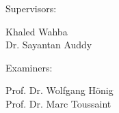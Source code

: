 \begin{center}
\begin{minipage}[b]{0.4\textwidth}
    Supervisors:               \\
    \begin{hsheadfont}
    Khaled Wahba \\
    Dr. Sayantan Auddy \\
    \end{hsheadfont}
\end{minipage}
\begin{minipage}[b]{0.35\textwidth}
  

    Examiners:              \\
    \begin{hsheadfont}
    Prof. Dr. Wolfgang Hönig \\ 
    Prof. Dr. Marc Toussaint \\
    \end{hsheadfont}
\end{minipage}
\end{center}
    














\restoregeometry

